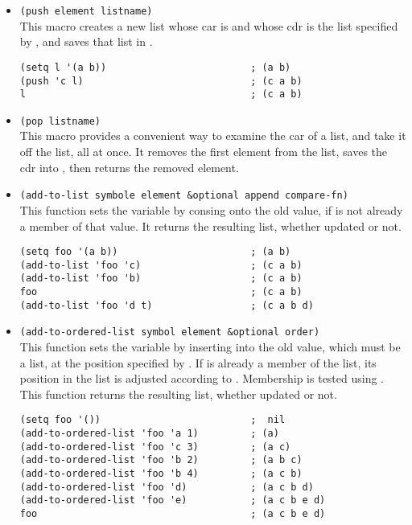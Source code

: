 \begin{itemize}
\item \lstinline|(push element listname)|\\
  This macro creates a new list whose car is  and whose cdr is the list specified by , and saves that list in .
\begin{lstlisting}
(setq l '(a b))                         ; (a b)
(push 'c l)                             ; (c a b)
l                                       ; (c a b)
\end{lstlisting}
\item \lstinline|(pop listname)|\\
  This macro provides a convenient way to examine the car of a list, and take it off the list, all at once.
  It removes the first element from the list, saves the cdr into , then returns the removed element.
\item \lstinline|(add-to-list symbole element &optional append compare-fn)|\\
  This function sets the variable  by consing  onto the old value, if  is not already a member of that value.
  It returns the resulting list, whether updated or not.
\begin{lstlisting}
(setq foo '(a b))                       ; (a b)
(add-to-list 'foo 'c)                   ; (c a b)
(add-to-list 'foo 'b)                   ; (c a b)
foo                                     ; (c a b)
(add-to-list 'foo 'd t)                 ; (c a b d)
\end{lstlisting}
\item \lstinline|(add-to-ordered-list symbol element &optional order)|\\
  This function sets the variable  by inserting  into the old value, which must be a list, at the position specified by .
  If  is already a member of the list, its position in the list is adjusted according to .
  Membership is tested using .
  This function returns the resulting list, whether updated or not.
\begin{lstlisting}
(setq foo '())                          ;  nil
(add-to-ordered-list 'foo 'a 1)         ; (a)
(add-to-ordered-list 'foo 'c 3)         ; (a c)
(add-to-ordered-list 'foo 'b 2)         ; (a b c)
(add-to-ordered-list 'foo 'b 4)         ; (a c b)
(add-to-ordered-list 'foo 'd)           ; (a c b d)
(add-to-ordered-list 'foo 'e)           ; (a c b e d)
foo                                     ; (a c b e d)
\end{lstlisting}
\end{itemize}

